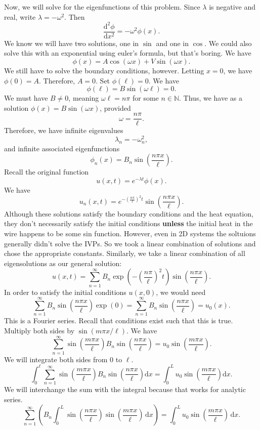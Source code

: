 Now, we will solve for the eigenfunctions of this problem. Since $\lambda $ is negative and real, write $\lambda =-\omega ^2$. Then
\[
	\frac{\mathrm{d}^2\phi }{\mathrm{d}x^2} =-\omega ^2 \phi (x)
.\]
We know we will have two solutions, one in $\sin $ and one in $\cos $. We could also solve this with an exponential using euler's formula, but that's boring. We have
\[
	\phi (x)=A \cos (\omega x)+V\sin (\omega x)
.\]
We still have to solve the boundary conditions, however. Letting $x=0$, we have $\phi (0)=A$. Therefore, $A=0$. Set $\phi (\ell )=0$. We have
\[
	\phi (\ell )=B\sin (\omega \ell )=0
.\]
We must have $B\neq 0$, meaning $\omega \ell =n\pi $ for some $n\in\mathbb{N}$. Thus, we have as a solution $\phi (x)=B\sin (\omega x)$, provided
\[
	\omega =\frac{n\pi }{\ell }
.\]
Therefore, we have infinite eigenvalues
\[
	\lambda_n = -\omega_n^2
,\]
and infinite associated eigenfunctions
\[
	\phi _n(x)=B_n\sin \left( \frac{n\pi x}{\ell } \right) 
.\]
Recall the original function
\[
	u(x,t)=e^{-\lambda t}\phi (x)
.\]
We have
\[
	u_n(x,t)=e^{-\left( \frac{n\pi }{\ell } \right) ^2t}\sin \left( \frac{n\pi x}{\ell } \right) 
.\]
Although these solutions satisfy the boundary conditions and the heat equation, they don't necessarily satisfy the initial conditions \textbf{unless} the initial heat in the wire happens to be some sin function. However, even in 2D systems the soltuions generally didn't solve the IVPs. So we took a linear combination of solutions and chose the appropriate constants. Similarly, we take a linear combination of all eigensolutions as our general solution:
\[
	u(x,t)=\sum_{n=1}^{\infty} B_n\exp \left( -\left(\frac{n\pi }{\ell }\right)^2t \right) \sin \left( \frac{n\pi x}{\ell } \right) 
.\]
In order to satisfy the initial conditions $u(x,0)$, we would need
\[
	\sum_{n=1}^{\infty} B_n \sin \left( \frac{n\pi x}{\ell } \right) \exp (0)=\sum_{n=1}^{\infty} B_n \sin \left( \frac{n\pi x}{\ell } \right) =u_0(x)
.\]
This is a Fourier series. Recall that conditions exist such that this is true. Multiply both sides by $\sin (m\pi x /\ell )$. We have
\[
	\sum_{n=1}^{\infty} \sin \left( \frac{m\pi x}{\ell } \right) B_n\sin \left( \frac{n\pi x}{\ell } \right) =u_0 \sin \left( \frac{m\pi x}{\ell } \right) 
.\]
We will integrate both sides from $0$ to $\ell $.
\[
	\int_{0}^{\ell }\sum_{n=1}^{\infty} \sin \left( \frac{m\pi x}{\ell } \right) B_n\sin \left( \frac{n\pi x}{\ell } \right)\mathrm{d} x =\int_{0}^{L}u_0 \sin \left( \frac{m\pi x}{\ell } \right) \mathrm{d}x 
.\]
We will interchange the sum with the integral because that works for analytic series.
\[
	\sum_{n=1}^{\infty}\left( B_n \int_{0}^{L} \sin \left( \frac{n\pi x}{\ell } \right) \sin \left( \frac{m\pi x}{\ell } \right)  \,\mathrm{d} x\right)=\int_{0}^{L} u_0 \sin \left( \frac{m\pi x}{\ell } \right)  \,\mathrm{d} x
.\]
